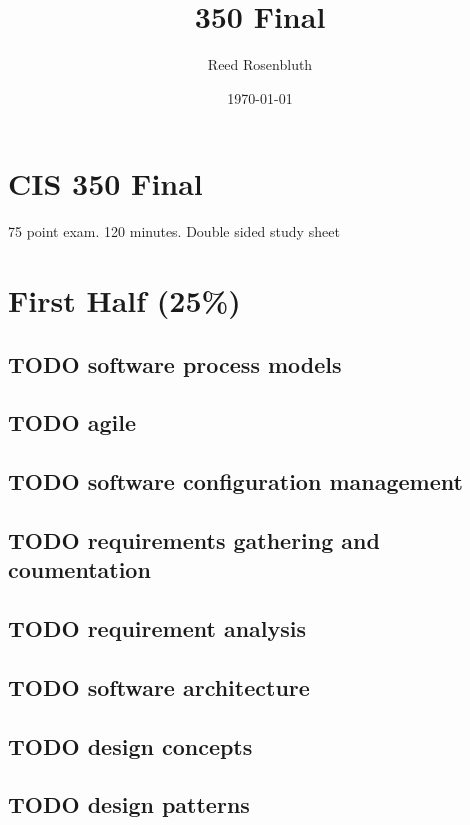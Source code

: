\documentclass[11pt]{article}
\author{Reed Rosenbluth}
\date{\today}
\title{350 Final}
\begin{document}
\maketitle
\tableofcontents


\section{CIS 350 Final}
\label{sec-1}

75 point exam. 120 minutes. Double sided study sheet

\section{First Half (25\%)}
\label{sec-2}
\subsection{{\bfseries\sffamily TODO} software process models}
\label{sec-2-1}
\subsection{{\bfseries\sffamily TODO} agile}
\label{sec-2-2}
\subsection{{\bfseries\sffamily TODO} software configuration management}
\label{sec-2-3}
\subsection{{\bfseries\sffamily TODO} requirements gathering and coumentation}
\label{sec-2-4}
\subsection{{\bfseries\sffamily TODO} requirement analysis}
\label{sec-2-5}
\subsection{{\bfseries\sffamily TODO} software architecture}
\label{sec-2-6}
\subsection{{\bfseries\sffamily TODO} design concepts}
\label{sec-2-7}
\subsection{{\bfseries\sffamily TODO} design patterns}
\label{sec-2-8}
\end{document}
